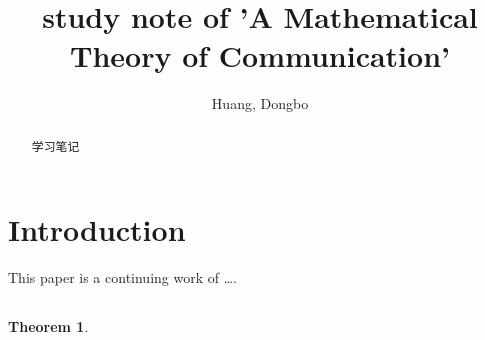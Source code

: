 \documentclass[conference]{IEEEtran}
\title{study note of 'A Mathematical Theory of Communication'}
\author{Huang, Dongbo}
\theoremstyle{plain}
\newtheorem{theorem}{Theorem}[section]
\theoremstyle{definition}
\theoremstyle{remark}
\begin{document}


\maketitle
\begin{abstract}  
学习笔记 
\end{abstract}  

\section{Introduction}
This paper is a continuing work of \ldots.


\subsection{}

\begin{theorem}

\end{theorem}
\end{document}
